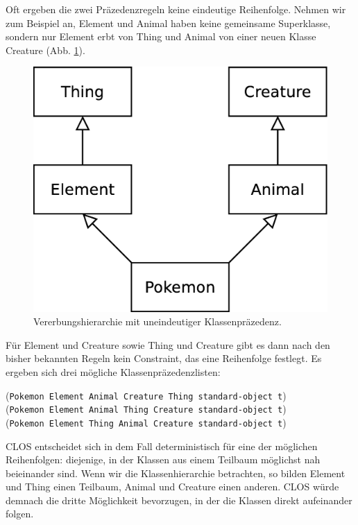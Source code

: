 Oft ergeben die zwei Präzedenzregeln keine eindeutige Reihenfolge. Nehmen wir zum Beispiel an, Element und Animal haben keine gemeinsame Superklasse, sondern nur Element erbt von Thing und Animal von einer neuen Klasse Creature (Abb. \ref{creature}). 

\begin{figure}[h]
 \centering
 \includegraphics[scale=0.3]{pictures/creature}
 \caption{Vererbungshierarchie mit uneindeutiger Klassenpräzedenz.}
 \label{creature}
\end{figure}

Für Element und Creature sowie Thing und Creature gibt es dann nach den bisher bekannten Regeln kein Constraint, das eine Reihenfolge festlegt. Es ergeben sich drei mögliche Klassenpräzedenzlisten:

(\texttt{Pokemon Element Animal Creature Thing standard-object t})\\
(\texttt{Pokemon Element Animal Thing Creature standard-object t})\\ 
(\texttt{Pokemon Element Thing Animal Creature standard-object t})

CLOS entscheidet sich in dem Fall deterministisch für eine der möglichen Reihenfolgen: diejenige, in der Klassen aus einem Teilbaum möglichst nah beieinander sind. Wenn wir die Klassenhierarchie betrachten, so bilden Element und Thing einen Teilbaum, Animal und Creature einen anderen. CLOS würde demnach die dritte Möglichkeit bevorzugen, in der die Klassen direkt aufeinander folgen.

